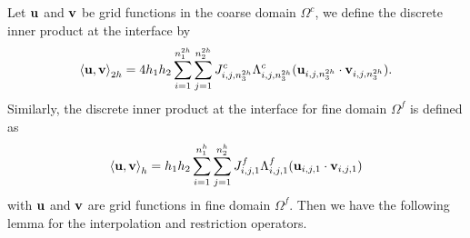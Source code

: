 
Let ${\bf u}$ and ${\bf v}$ be grid functions in the coarse domain $\Omega^c$, we define the discrete inner product at the interface by
\begin{equation}\label{scalar_product_discrete_interface_c}
\left<{\bf u}, {\bf v}\right>_{2h} = 4h_1h_2\sum_{i=1}^{n_1^{2h}}\sum_{j=1}^{n_2^{2h}}{  J}_{i,j,n_3^{2h}}^{c}\Lambda^{c}_{i,j,n_3^{2h}}({\bf u}_{i,j,n_3^{2h}}\cdot {\bf v}_{i,j,n_3^{2h}}).
\end{equation}
Similarly, the discrete inner product at the interface for fine domain $\Omega^f$ is defined as
\begin{equation}\label{scalar_product_discrete_interface_f}
\left<{\bf u}, {\bf v}\right>_{h} = h_1h_2\sum_{i=1}^{n_1^{h}}\sum_{j=1}^{n_2^{h}}{  J}_{i,j,1}^{f}\Lambda^{f}_{i,j,1}({\bf u}_{i,j,1}\cdot {\bf v}_{i,j,1})
\end{equation}
with $\bf u$ and $\bf v$ are grid functions in fine domain $\Omega^f$. Then we have the following lemma for the interpolation and restriction operators.
 
